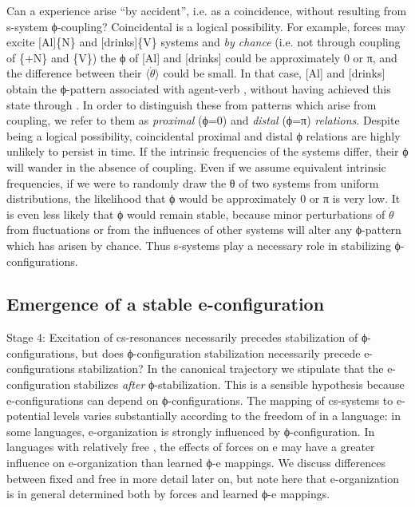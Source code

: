 Can a  experience arise “by accident”, i.e. as a coincidence, without resulting from s-system ϕ-coupling? Coincidental  is a logical possibility. For example,  forces may excite [Al]\{N\} and [drinks]\{V\} systems and \textit{by chance} (i.e. not through coupling of \{+N\} and \{V\}) the ϕ of [Al] and [drinks] could be approximately 0 or π, and the difference between their $\langle\dot{\theta}\rangle$ could be small. In that case, [Al] and [drinks] obtain the ϕ-pattern associated with agent-verb , without having achieved this state through . In order to distinguish these from patterns which arise from coupling, we refer to them as \textit{proximal} (ϕ=0) and \textit{distal} (ϕ=π) \textit{relations}. Despite being a logical possibility, coincidental proximal and distal ϕ relations are highly unlikely to persist in time. If the intrinsic frequencies of the systems differ, their ϕ will wander in the absence of coupling. Even if we assume equivalent intrinsic frequencies, if we were to randomly draw the θ of two systems from uniform distributions, the likelihood that ϕ would be approximately 0 or π is very low. It is even less likely that ϕ would remain stable, because minor perturbations of $\dot{\theta}$ from  fluctuations or from the influences of other systems will alter any ϕ-pattern which has arisen by chance. Thus s-systems play a necessary role in stabilizing ϕ-configurations.

\subsection{Emergence of a stable e-configuration}

Stage 4: Excitation of cs-resonances necessarily precedes stabilization of ϕ-con\-fig\-u\-ra\-tions, but does ϕ-configuration stabilization necessarily precede e-con\-fig\-u\-ra\-tions stabilization? In the canonical trajectory we stipulate that the e-configuration stabilizes \textit{after} ϕ-stabilization. This is a sensible hypothesis because e-configurations can depend on ϕ-configurations. The mapping of cs-sys\-tems to e-potential levels varies substantially according to the freedom of  in a language: in some languages, e-organization is strongly influenced by ϕ-configuration. In languages with relatively free , the effects of  forces on e may have a greater influence on e-organization than learned ϕ-e mappings. We discuss differences between fixed and  free  in more detail later on, but note here that e-organization is in general determined both by  forces and learned ϕ-e mappings.

